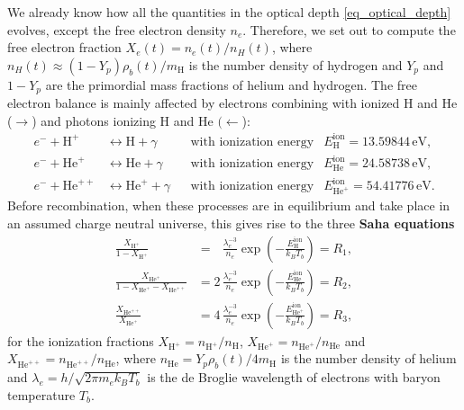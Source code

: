 \documentclass[10pt,a4paper]{article}
\begin{document}
We already know how all the quantities in the optical depth \eqref{eq_optical_depth} evolves, except the free electron density $n_e$.
Therefore, we set out to compute the free electron fraction $X_e(t) = n_e(t) / n_H(t)$,
where $n_H(t) \approx (1-Y_p) \rho_b(t) / m_\text{H}$ is the number density of hydrogen and
$Y_p$ and $1-Y_p$ are the primordial mass fractions of helium and hydrogen.
The free electron balance is mainly affected by
electrons combining with ionized H and He ($\rightarrow$)
and photons ionizing H and He $(\leftarrow$):
\begin{subequations}
\begin{align}
	e^- + \text{H}^+ &\leftrightarrow \text{H} + \gamma && \text{with ionization energy} & E_\text{H}^\text{ion} = 13.59844\,\mathrm{eV}, \\
	e^- + \text{He}^+ &\leftrightarrow \text{He} + \gamma && \text{with ionization energy} & E_\text{He}^\text{ion} = 24.58738\,\mathrm{eV}, \\
	e^- + \text{He}^{++} &\leftrightarrow \text{He}^+ + \gamma && \text{with ionization energy} & E_{\text{He}^+}^\text{ion} = 54.41776\,\mathrm{eV}.
\end{align}%
\label{eq_recombinations}%
\end{subequations}%
Before recombination, when these processes are in equilibrium and take place in an assumed charge neutral universe,
this gives rise to the three \textbf{Saha equations}
\newcommand{\XHp}{X_{\text{H}^+}}
\newcommand{\XHep}{X_{\text{He}^+}}
\newcommand{\XHepp}{X_{\text{He}^{++}}}
\begin{subequations}
\begin{align}
    \frac{\XHp}{1-\XHp} &= \phantom{1} \, \frac{\lambda_e^{-3}}{n_e} \exp\left(-\frac{E^\text{ion}_\text{H}}{k_B T_b}\right) = R_1, \\
    \frac{\XHep}{1 - \XHep - \XHepp} &= 2 \, \frac{\lambda_e^{-3}}{n_e} \exp \left(-\frac{E^\text{ion}_\text{He}}{k_B T_b} \right) = R_2, \\
    \frac{\XHepp}{\XHep} &= 4 \, \frac{\lambda_e^{-3}}{n_e} \exp\left(-\frac{E^\text{ion}_{\text{He}^+}}{k_B T_b}\right) = R_3,
\end{align}
\label{eq_saha_H_He}
\end{subequations}
for the ionization fractions $\XHp = n_{\text{H}^+} / n_\text{H}$, $\XHep = n_{\text{He}^+} / n_\text{He}$ and $\XHepp = n_{\text{He}^{++}} / n_\text{He}$,
where $n_\text{He} = Y_p \rho_b(t) / 4 m_\text{H}$ is the number density of helium and $\lambda_e = h / \sqrt{2 \pi m_e k_B T_b}$ is the de Broglie wavelength of electrons with baryon temperature $T_b$.
\end{document}
